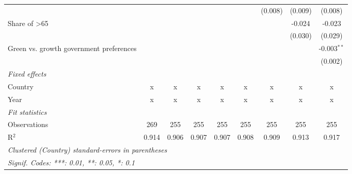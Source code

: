 \begin{table}[htbp]
\begin{tabular}{lcccccccc}
                                                  &              &             &         &         &         & (0.008) & (0.009) & (0.008)\\   
      Share of >65                                &              &             &         &         &         &         & -0.024  & -0.023\\   
                                                  &              &             &         &         &         &         & (0.030) & (0.029)\\   
      Green vs. growth government preferences     &              &             &         &         &         &         &         & -0.003$^{**}$\\   
                                                  &              &             &         &         &         &         &         & (0.002)\\   
      \emph{Fixed effects}\\
      Country                                     & x            & x           & x       & x       & x       & x       & x       & x\\  
      Year                                        & x            & x           & x       & x       & x       & x       & x       & x\\  
      \midrule \emph{Fit statistics}\\
      Observations                                & 269          & 255         & 255     & 255     & 255     & 255     & 255     & 255\\  
      R$^2$                                       & 0.914        & 0.906       & 0.907   & 0.907   & 0.908   & 0.909   & 0.913   & 0.917\\  
      \midrule
      \multicolumn{9}{l}{\emph{Clustered (Country) standard-errors in parentheses}}\\
      \multicolumn{9}{l}{\emph{Signif. Codes: ***: 0.01, **: 0.05, *: 0.1}}\\
   \end{tabular}
\end{table}


